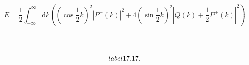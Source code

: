 \documentclass[main.tex]{subfiles}
\begin{document}
\begin{equation}\label{17.76}
	E=\frac{1}{2} \int_{-\infty}^{\infty} \mathrm{d} k\left(\left(\cos \frac{1}{2} k\right)^{2}\left|P^{+}(k)\right|^{2}+4\left(\sin \frac{1}{2} k\right)^{2}\left|Q(k)+\frac{1}{2} P^{+}(k)\right|^{2}\right)
\end{equation}



\begin{equation}\label{17.77}
	
\end{equation}



\begin{equation}\label{17.}
	
\end{equation}



\begin{equation}\label{17.}
	
\end{equation}



\begin{equation}\\begin{equation}\label{17.}{17.}
	
\end{equation}

\fi
\end{document}
